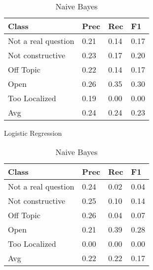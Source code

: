 \begin{table}[!htpb]
\centering
\begin{minipage}{.5\linewidth}
    \begin{tabular}{|l|l|l|l|} \hline
    \textbf{Class}& \textbf{Prec} & \textbf{Rec} & \textbf{F1} \\ \hline
    Not a real question & 0.21      & 0.14   & 0.17    \\
    Not constructive    & 0.23      & 0.17   & 0.20     \\
    Off Topic           & 0.22      & 0.14   & 0.17     \\
    Open                & 0.26      & 0.35   & 0.30     \\
    Too Localized       & 0.19      & 0.00   & 0.00     \\ \hline
    Avg                 & 0.24      & 0.24   & 0.23   \\ \hline  
    \end{tabular}
    \caption{Logistic Regression}
    \label{tab:lr}
\end{minipage}%
\begin{minipage}{.5\linewidth}
    \begin{tabular}{|l|l|l|l|} \hline
    \textbf{Class}& \textbf{Prec} & \textbf{Rec} & \textbf{F1} \\ \hline
    Not a real question & 0.24      & 0.02   & 0.04     \\
    Not constructive    & 0.25      & 0.10   & 0.14     \\
    Off Topic           & 0.26      & 0.04   & 0.07     \\
    Open                & 0.21      & 0.39   & 0.28     \\
    Too Localized       & 0.00      & 0.00   & 0.00     \\ \hline
    Avg                 & 0.22      & 0.22   & 0.17   \\ \hline  
    \end{tabular}
    \caption{Naive Bayes}
    \label{tab:nb}
\end{minipage}
\end{table}


